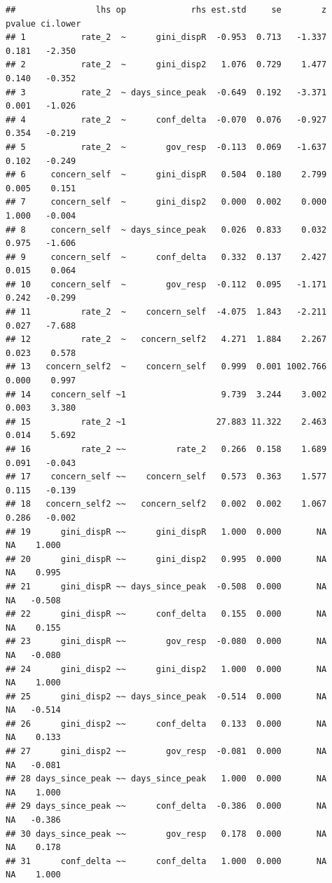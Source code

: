 \documentclass[
]{article}
\begin{document}
\begin{verbatim}
##                lhs op             rhs est.std     se        z pvalue ci.lower
## 1           rate_2  ~      gini_dispR  -0.953  0.713   -1.337  0.181   -2.350
## 2           rate_2  ~      gini_disp2   1.076  0.729    1.477  0.140   -0.352
## 3           rate_2  ~ days_since_peak  -0.649  0.192   -3.371  0.001   -1.026
## 4           rate_2  ~      conf_delta  -0.070  0.076   -0.927  0.354   -0.219
## 5           rate_2  ~        gov_resp  -0.113  0.069   -1.637  0.102   -0.249
## 6     concern_self  ~      gini_dispR   0.504  0.180    2.799  0.005    0.151
## 7     concern_self  ~      gini_disp2   0.000  0.002    0.000  1.000   -0.004
## 8     concern_self  ~ days_since_peak   0.026  0.833    0.032  0.975   -1.606
## 9     concern_self  ~      conf_delta   0.332  0.137    2.427  0.015    0.064
## 10    concern_self  ~        gov_resp  -0.112  0.095   -1.171  0.242   -0.299
## 11          rate_2  ~    concern_self  -4.075  1.843   -2.211  0.027   -7.688
## 12          rate_2  ~   concern_self2   4.271  1.884    2.267  0.023    0.578
## 13   concern_self2  ~    concern_self   0.999  0.001 1002.766  0.000    0.997
## 14    concern_self ~1                   9.739  3.244    3.002  0.003    3.380
## 15          rate_2 ~1                  27.883 11.322    2.463  0.014    5.692
## 16          rate_2 ~~          rate_2   0.266  0.158    1.689  0.091   -0.043
## 17    concern_self ~~    concern_self   0.573  0.363    1.577  0.115   -0.139
## 18   concern_self2 ~~   concern_self2   0.002  0.002    1.067  0.286   -0.002
## 19      gini_dispR ~~      gini_dispR   1.000  0.000       NA     NA    1.000
## 20      gini_dispR ~~      gini_disp2   0.995  0.000       NA     NA    0.995
## 21      gini_dispR ~~ days_since_peak  -0.508  0.000       NA     NA   -0.508
## 22      gini_dispR ~~      conf_delta   0.155  0.000       NA     NA    0.155
## 23      gini_dispR ~~        gov_resp  -0.080  0.000       NA     NA   -0.080
## 24      gini_disp2 ~~      gini_disp2   1.000  0.000       NA     NA    1.000
## 25      gini_disp2 ~~ days_since_peak  -0.514  0.000       NA     NA   -0.514
## 26      gini_disp2 ~~      conf_delta   0.133  0.000       NA     NA    0.133
## 27      gini_disp2 ~~        gov_resp  -0.081  0.000       NA     NA   -0.081
## 28 days_since_peak ~~ days_since_peak   1.000  0.000       NA     NA    1.000
## 29 days_since_peak ~~      conf_delta  -0.386  0.000       NA     NA   -0.386
## 30 days_since_peak ~~        gov_resp   0.178  0.000       NA     NA    0.178
## 31      conf_delta ~~      conf_delta   1.000  0.000       NA     NA    1.000

\end{verbatim}
\end{document}
